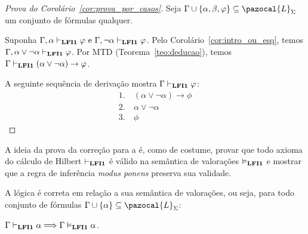     \begin{proof}[Prova do Corolário~\ref{cor:prova_por_casos}]
        Seja $\Gamma \cup \{\alpha, \beta, \phi\} \subseteq \pazocal{L}_{\Sigma}$ um conjunto de fórmulas qualquer.

        Suponha $\Gamma, \alpha \vdash_{{\normalfont\textbf{LFI1}}{}} \varphi \text{ e }\Gamma, \neg\alpha \vdash_{{\normalfont\textbf{LFI1}}{}} \varphi$. Pelo Corolário~\ref{cor:intro_ou_esq}, temos $\Gamma, \alpha \lor \neg \alpha \vdash_{{\normalfont\textbf{LFI1}}{}} \varphi$. Por MTD (Teorema~\ref{teo:deducao}), temos $\Gamma \vdash_{{\normalfont\textbf{LFI1}}{}} (\alpha \lor \neg \alpha) \to \varphi$.

        A seguinte sequência de derivação mostra $\Gamma\vdash_{{\normalfont\textbf{LFI1}}{}} \varphi$:
        \begin{align*}
            1. ~& (\alpha \lor \neg \alpha) \to \phi\tag{MTD aplicado à suposição} \\
            2. ~& \alpha \lor \neg \alpha \tag{Ax10} \\
            3. ~& \phi \tag{MP 1,2}
        \end{align*}
    \end{proof}

    A ideia da prova da correção para a \lfium{} é, como de costume, provar que todo axioma do cálculo de Hilbert $\vdash_{{\normalfont\textbf{LFI1}}{}}$ é válido na semântica de valorações $\vDash_{{\normalfont\textbf{LFI1}}{}}$ e mostrar que a regra de inferência \textit{modus ponens} preserva sua validade.

    \begin{teorema}[Correção]\label{teo:correcao}
        A lógica {\normalfont\lfium{}} é correta em relação a sua semântica de valorações, ou seja, para todo conjunto de fórmulas $\Gamma \cup \{\alpha\} \subseteq \pazocal{L}_{\Sigma}$:

        \centering
        {\normalfont{} $\Gamma \vdash_{{\normalfont\textbf{LFI1}}{}} \alpha \Longrightarrow \Gamma \vDash_{{\normalfont\textbf{LFI1}}{}} \alpha$.}
    \end{teorema}

